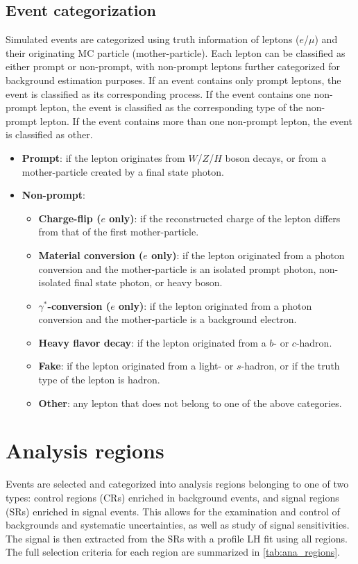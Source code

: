 \documentclass[../thesis.tex]{subfiles}
\begin{document}
\subsection{Event categorization}
Simulated events are categorized using truth information of leptons ($e$/$\mu$) and their originating \acs{MC} particle (mother-particle). Each lepton can be classified as either prompt or non-prompt, with non-prompt leptons further categorized for background estimation purposes. If an event contains only prompt leptons, the event is classified as its corresponding process. If the event contains one non-prompt lepton, the event is classified as the corresponding type of the non-prompt lepton. If the event contains more than one non-prompt lepton, the event is classified as other.

\begin{itemize}
\item \textbf{Prompt}: if the lepton originates from $W$/$Z$/$H$ boson decays, or from a mother-particle created by a final state photon.
\item \textbf{Non-prompt}:
	\begin{itemize}
	\item \textbf{Charge-flip ($e$ only)}: if the reconstructed charge of the lepton differs from that of the first mother-particle.
	\item \textbf{Material conversion ($e$ only)}: if the lepton originated from a photon conversion and the mother-particle is an isolated prompt photon, non-isolated final state photon, or heavy boson.
	\item \textbf{$\gamma^*$-conversion ($e$ only)}: if the lepton originated from a photon conversion and the mother-particle is a background electron.
	\item \textbf{Heavy flavor decay}: if the lepton originated from a $b$- or $c$-hadron.
	\item \textbf{Fake}: if the lepton originated from a light- or $s$-hadron, or if the truth type of the lepton is hadron.
	\item \textbf{Other}: any lepton that does not belong to one of the above categories.
	\end{itemize}
\end{itemize}

\section{Analysis regions}
\label{sec:ana}
Events are selected and categorized into analysis regions belonging to one of two types: control regions (\acs{CR}s) enriched in background events, and signal regions (\acs{SR}s) enriched in signal events. This allows for the examination and control of backgrounds and systematic uncertainties, as well as study of signal sensitivities. The signal is then extracted from the \acs{SR}s with a profile \acs{LH} fit using all regions. The full selection criteria for each region are summarized in \autoref{tab:ana_regions}.
\end{document}
